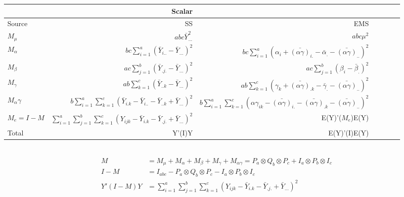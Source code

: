 \documentclass{homework}
\begin{document}
\begin{itemize}
\begin{tabular}{l r r r r r r }
& Scalar & & & \\\hline
Source & SS & EMS  \\\hline
$M_\mu$ &  $abc\bar{Y}^2_{...}$ & $abc\mu^2$  \\
$M_\alpha$	&  $bc\sum_{i=1}^{a}(\bar{Y}_{i..}- \bar{Y}_{...})^2$ & $bc\sum_{i=1}^{a}(\alpha_i + \bar{(\alpha\gamma)}_{i.}- \bar{\alpha}_{.} - \bar{(\alpha\gamma)}_{..})^2$ \\
$M_\beta$	&  $ac\sum_{j=1}^{b}(\bar{Y}_{.j.}- \bar{Y}_{...})^2$ & $ac\sum_{j=1}^{b}(\beta_i - \bar{\beta}_{.})^2$ \\
$M_\gamma$	& $ab\sum_{k=1}^{c}(\bar{Y}_{..k}- \bar{Y}_{...})^2$ & $ab\sum_{k=1}^{c}(\gamma_k + \bar{(\alpha\gamma)}_{.k}- \bar{\gamma}_{.} - \bar{(\alpha\gamma)}_{..})^2$ \\
$M_\alpha\gamma$	& $b\sum_{i=1}^{a}\sum_{k=1}^{c}(\bar{Y}_{i.k}- \bar{Y}_{i..}- \bar{Y}_{..k} + \bar{Y}_{...})^2$ & $b\sum_{i=1}^{a}\sum_{k=1}^{c}(\alpha\gamma_{ik} - \bar{(\alpha\gamma)}_{i.} - \bar{(\alpha\gamma)}_{.k} - \bar{(\alpha\gamma)}_{..})^2$ \\
$M_e = I-M$	& $\sum_{i=1}^{a}\sum_{j=1}^{b}\sum_{k=1}^{c}(Y_{ijk}-\bar{Y}_{i.k} -\bar{Y}_{.j.}  +\bar{Y}_{...})^2$ & E(Y)'($M_e$)E(Y) \\
Total	& Y'(I)Y & E(Y)'(I)E(Y) \\
\hline
\end{tabular}\\

\begin{align*}
    M &= M_{\mu}+M_{\alpha} + M_{\beta} + M_{\gamma} + M_{\alpha\gamma} = P_a \otimes Q_b \otimes P_c + I_a \otimes P_b \otimes I_c\\
    I-M &= I_{abc}- P_a \otimes Q_b \otimes P_c - I_a \otimes P_b \otimes I_c \\
    Y'(I-M)Y & = \sum_{i=1}^{a}\sum_{j=1}^{b}\sum_{k=1}^{c}(Y_{ijk}-\bar{Y}_{i.k} -\bar{Y}_{.j.}  +\bar{Y}_{...})^2
\end{align*}
\end{itemize}
\end{document}
